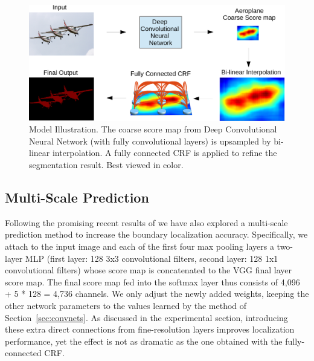 \begin{figure}
  \centering
  \includegraphics[width=0.7\linewidth]{fig/model_illustration3.pdf}
  \caption{Model Illustration. The coarse score map from Deep Convolutional Neural Network (with fully convolutional layers) is upsampled by bi-linear
    interpolation. A fully connected CRF is applied to refine the segmentation result. Best viewed in color.}
  \label{fig:ModelIllustration}
\end{figure}

\subsection{Multi-Scale Prediction}
\label{sec:multiscale}

Following the promising recent results of \cite{hariharan2014hypercolumns,
  long2014fully} we have also explored a multi-scale prediction method to
increase the boundary localization accuracy. Specifically, we attach to the input image and each of the first four max pooling layers a two-layer MLP (first layer: 128 3x3 convolutional filters, second layer: 128 1x1 convolutional filters) whose score map is concatenated to the VGG final layer score map. The final score map fed into the softmax layer thus consists of 4,096 + 5 * 128 = 4,736 channels. We
only adjust the newly added weights, keeping the other network parameters to
the values learned by the method of Section~\ref{sec:convnets}. As
discussed in the experimental section, introducing these extra direct
connections from fine-resolution layers improves localization performance, yet
the effect is not as dramatic as the one obtained with the fully-connected
CRF. 
